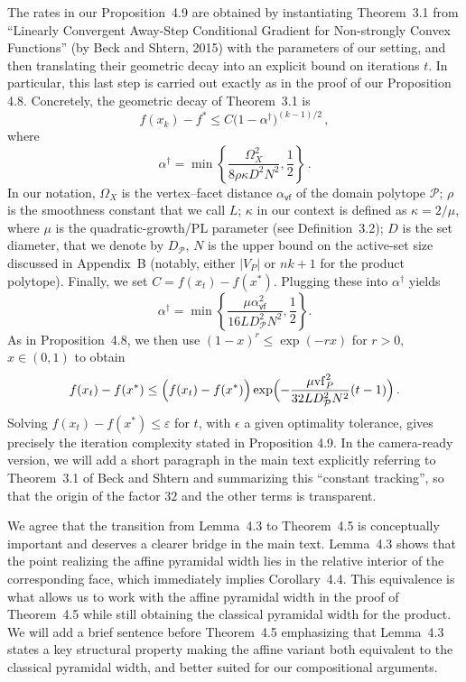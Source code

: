 \documentclass[a4wide]{article}
\begin{document}
The rates in our Proposition~4.9 are obtained by instantiating Theorem~3.1 from ``Linearly Convergent Away-Step Conditional Gradient for Non-strongly Convex Functions'' (by Beck and Shtern, 2015) with the parameters of our setting, and then translating their geometric decay into an explicit bound on iterations $t$.
In particular, this last step is carried out exactly as in the proof of our Proposition 4.8. Concretely, the geometric decay of Theorem~3.1 is
\[
f(x_k) - f^\ast \le C\bigl(1 - \alpha^\dagger\bigr)^{(k-1)/2}\,,
\]
where
\[
\alpha^\dagger
=
\min\left\{
  \frac{\Omega_X^2}{8 \rho \kappa D^2 N^2},
  \frac{1}{2}
\right\}\,.
\]
In our notation, $\Omega_X$ is the vertex–facet distance $\alpha_{\mathsf{vf}}$ of the domain polytope $\mathcal{P}$; $\rho$ is the smoothness constant that we call $L$; $\kappa$ in our context is defined as $\kappa = 2/\mu$, where $\mu$ is the quadratic-growth/PL parameter (see Definition~3.2); $D$ is the set diameter, that we denote by $D_{\mathcal{P}}$, $N$ is the upper bound on the active-set size discussed in Appendix~B (notably, either $|V_P|$ or $nk+1$ for the product polytope). Finally, we set $C = f(x_t) - f(x^\ast)$. Plugging these into $\alpha^\dagger$ yields
\[
\alpha^\dagger
=
\min\left\{
\frac{\mu\alpha_{\mathsf{vf}}^2}{16LD_{\mathcal{P}}^2N^2},
\frac{1}{2}
\right\}.
\]
As in Proposition~4.8, we then use $(1-x)^r \le \exp(-rx)$ for $r>0$, $x\in(0,1)$ to obtain
\[
f(x_t) - f(x^\ast) \le
\Bigl(f(x_t) - f(x^\ast)\Bigr) \exp\Bigl(- \frac{\mu\mathrm{vf}_P^2}{32 L D_{\mathcal{P}}^2 N^2} (t-1)\Bigr)\,.
\]
Solving $f(x_t) - f(x^\ast) \le \varepsilon$ for $t$, with $\epsilon$ a given optimality tolerance, gives precisely the iteration complexity stated in Proposition 4.9. In the camera-ready version, we will add a short paragraph in the main text explicitly referring to Theorem~3.1 of Beck and Shtern and summarizing this ``constant tracking'', so that the origin of the factor $32$ and the other terms is transparent.

We agree that the transition from Lemma~4.3 to Theorem~4.5 is conceptually important and deserves a clearer bridge in the main text. Lemma~4.3 shows that the point realizing the affine pyramidal width lies in the relative interior of the corresponding face, which immediately implies Corollary~4.4. This equivalence is what allows us to work with the affine pyramidal width in the proof of Theorem~4.5 while still obtaining the classical pyramidal width for the product. We will add a brief sentence before Theorem~4.5 emphasizing that Lemma~4.3 states a key structural property making the affine variant both equivalent to the classical pyramidal width, and better suited for our compositional arguments.
\end{document}
